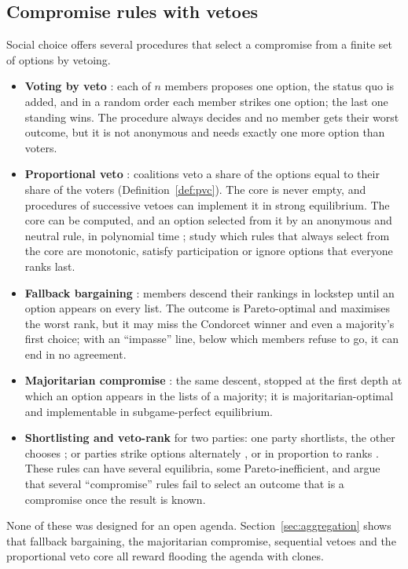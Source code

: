 \subsection{Compromise rules with vetoes}

Social choice offers several procedures that select a compromise from a finite set of options by
vetoing.
\begin{itemize}
  \item \textbf{Voting by veto} \citep{Mueller1978}: each of $n$ members proposes one option, the status
  quo is added, and in a random order each member strikes one option; the last one standing wins. The
  procedure always decides and no member gets their worst outcome, but it is not anonymous and needs
  exactly one more option than voters.
  \item \textbf{Proportional veto} \citep{Moulin1981,Moulin1982,Moulin1983}: coalitions veto a share of
  the options equal to their share of the voters (Definition~\ref{def:pvc}). The core is never empty,
  and procedures of successive vetoes can implement it in strong equilibrium. The core can be computed,
  and an option selected from it by an anonymous and neutral rule, in polynomial time
  \citep{IanovskiKondratev2021}; \citet{KondratevIanovski2024} study which rules that always select from
  the core are monotonic, satisfy participation or ignore options that everyone ranks last.
  \item \textbf{Fallback bargaining} \citep{BramsKilgour2001}: members descend their rankings in
  lockstep until an option appears on every list. The outcome is Pareto-optimal and maximises the worst
  rank, but it may miss the Condorcet winner and even a majority's first choice; with an ``impasse'' line,
  below which members refuse to go, it can end in no agreement.
  \item \textbf{Majoritarian compromise} \citep{SertelYilmaz1999,HurwiczSertel1999}: the same descent,
  stopped at the first depth at which an option appears in the lists of a majority; it is
  majoritarian-optimal and implementable in subgame-perfect equilibrium.
  \item \textbf{Shortlisting and veto-rank} for two parties: one party shortlists, the other chooses
  \citep{BarberaCoelho2017,BarberaCoelho2022}; or parties strike options alternately
  \citep{Anbarci1993}, or in proportion to ranks \citep{LaslierNunezSanver2021}. These rules can have
  several equilibria, some Pareto-inefficient, and \citet{CaillouxNapolitanoSanver2022} argue that several
  ``compromise'' rules fail to select an outcome that is a compromise once the result is known.
\end{itemize}
None of these was designed for an open agenda. Section~\ref{sec:aggregation} shows that fallback
bargaining, the majoritarian compromise, sequential vetoes and the proportional veto core all reward
flooding the agenda with clones.

